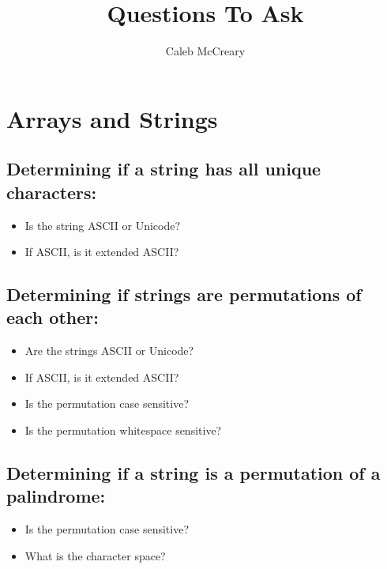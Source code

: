 \documentclass{article}
\author{Caleb McCreary}
\date{}
\title{Questions To Ask}
\begin{document}
\maketitle
\section*{Arrays and Strings}
\subsection*{Determining if a string has all unique characters:}
\begin{itemize}
    \item Is the string ASCII or Unicode?
    \item If ASCII, is it extended ASCII?
\end{itemize}

\subsection*{Determining if strings are permutations of each other:}
\begin{itemize}
    \item Are the strings ASCII or Unicode?
    \item If ASCII, is it extended ASCII?
    \item Is the permutation case sensitive?
    \item Is the permutation whitespace sensitive?
\end{itemize}

\subsection*{Determining if a string is a permutation of a palindrome:}
\begin{itemize}
    \item Is the permutation case sensitive?
    \item What is the character space? 
\end{itemize}
\end{document}

